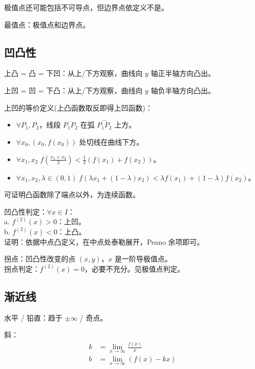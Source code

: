 \documentclass[12pt, a4paper, UTF8, openany]{ctexbook}
\newcommand{\difk}[2]{{#1}^{(#2)}}
\begin{document}
        极值点还可能包括{\heiti 不可导点}，但{\heiti 边界点依定义不是}。

        最值点：极值点和边界点。

        \subsection{凹凸性}
        {\heiti 上凸 = 凸} = 下凹：从上/下方观察，曲线向 $y$ 轴正半轴方向凸出。

        {\heiti 上凹 = 凹} = 下凸：从上/下方观察，曲线向 $y$ 轴负半轴方向凸出。

        上凹的等价定义(上凸函数取反即得上凹函数)：
        \begin{itemize}
            \item $\forall P_1, P_2$，线段 $\overline{P_1P_2}$ 在弧 $\overset{\frown}{P_1P_2}$ 上方。
            \item $\forall x_0, (x_0, f(x_0))$ 处切线在曲线下方。
            \item $\forall x_1, x_2 \; f(\frac{x_1 + x_2}{2}) < \frac{1}{2}(f(x_1) + f(x_2))$。
            \item $\forall x_1, x_2, \lambda \in (0, 1) \; 
                f(\lambda x_1 + (1 - \lambda)x_2) < \lambda f(x_1) + (1 - \lambda)f(x_2)$。
        \end{itemize}

        可证明凸函数除了端点以外，为连续函数。

        凹凸性判定：$\forall x \in I$：\\
        a. $\difk{f}{2}(x) > 0$：上凹。 \\
        b. $\difk{f}{2}(x) < 0$：上凸。 \\
        证明：依据中点凸定义，在中点处泰勒展开，Peano 余项即可。
        
        拐点：凹凸性改变的点 $(x, y)$，$x$ 是{\heiti 一阶导极值点}。\\
        拐点判定：$\difk{f}{2}(x) = 0$，必要{\heiti 不充分}。见极值点判定。

        \subsection{渐近线}
        水平 / 铅直：趋于 $\pm \infty$ / 奇点。

        斜：$$\begin{aligned}
            k &= \lim_{x \to \infty} \frac{f(x)}{x} \\
            b &= \lim_{x \to \infty} (f(x) - kx)
        \end{aligned}$$
\end{document}
